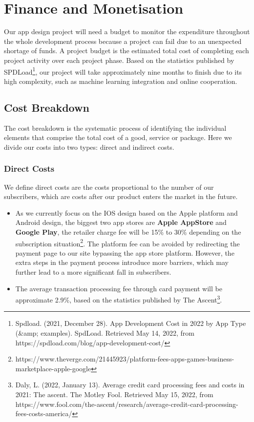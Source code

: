 \section{Finance and Monetisation}
Our app design project will need a budget to monitor the expenditure throughout the whole development process because a project can fail due to an unexpected shortage of funds. A project budget is the estimated total cost of completing each project activity over each project phase. Based on the statistics published by SPDLoad\footnote{Spdload. (2021, December 28). App Development Cost in 2022 by App Type (&amp; examples). SpdLoad. Retrieved May 14, 2022, from https://spdload.com/blog/app-development-cost/}, our project will take approximately nine months to finish due to its high complexity, such as machine learning integration and online cooperation.
\subsection{Cost Breakdown}
The cost breakdown is the systematic process of identifying the individual elements that comprise the total cost of a good, service or package. Here we divide our costs into two types: direct and indirect costs.
\subsubsection{Direct Costs}
We define direct costs are the costs proportional to the number of our subscribers, which are costs after our product enters the market in the future.
\begin{itemize}
\item As we currently focus on the IOS design based on the Apple platform and Android design, the biggest two app stores are \textbf{Apple AppStore} and \textbf{Google Play}, the retailer charge fee will be 15\% to 30\% depending on the subscription situation\footnote{https://www.theverge.com/21445923/platform-fees-apps-games-business-marketplace-apple-google}. The platform fee can be avoided by redirecting the payment page to our site bypassing the app store platform. However, the extra steps in the payment process introduce more barriers, which may further lead to a more significant fall in subscribers.
\item The average transaction processing fee through card payment will be approximate 2.9\%, based on the statistics published by The Ascent\footnote{Daly, L. (2022, January 13). Average credit card processing fees and costs in 2021: The ascent. The Motley Fool. Retrieved May 15, 2022, from https://www.fool.com/the-ascent/research/average-credit-card-processing-fees-costs-america/}.
\end{itemize}


